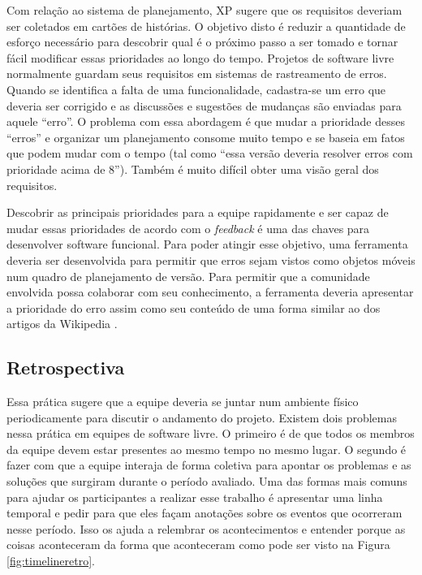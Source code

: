 Com relação ao sistema de planejamento, XP sugere que os requisitos
deveriam ser coletados em cartões de histórias. O objetivo disto é
reduzir a quantidade de esforço necessário para descobrir qual é o
próximo passo a ser tomado e tornar fácil modificar essas prioridades
ao longo do tempo. Projetos de software livre normalmente guardam seus
requisitos em sistemas de rastreamento de erros. Quando se identifica
a falta de uma funcionalidade, cadastra-se um erro que deveria ser
corrigido e as discussões e sugestões de mudanças são enviadas para
aquele ``erro''. O problema com essa abordagem é que mudar a
prioridade desses ``erros'' e organizar um planejamento consome muito
tempo e se baseia em fatos que podem mudar com o tempo (tal como
``essa versão deveria resolver erros com prioridade acima de
8''). Também é muito difícil obter uma visão geral dos requisitos.

Descobrir as principais prioridades para a equipe rapidamente e ser
capaz de mudar essas prioridades de acordo com o \emph{feedback} é uma
das chaves para desenvolver software funcional. Para poder atingir
esse objetivo, uma ferramenta deveria ser desenvolvida para permitir
que erros sejam vistos como objetos móveis num quadro de planejamento
de versão. Para permitir que a comunidade envolvida possa colaborar
com seu conhecimento, a ferramenta deveria apresentar a prioridade do
erro assim como seu conteúdo de uma forma similar ao dos artigos da
Wikipedia \cite{Surowiecki2004,Tapscott2006,Benkler2006}.

\subsection{Retrospectiva}
\label{subsec:retrospect}

Essa prática sugere que a equipe deveria se juntar num ambiente físico
periodicamente para discutir o andamento do projeto. Existem dois
problemas nessa prática em equipes de software livre. O primeiro é de
que todos os membros da equipe devem estar presentes ao mesmo tempo no
mesmo lugar. O segundo é fazer com que a equipe interaja de forma
coletiva para apontar os problemas e as soluções que surgiram durante
o período avaliado. Uma das formas mais comuns para ajudar os
participantes a realizar esse trabalho é apresentar uma linha temporal
e pedir para que eles façam anotações sobre os eventos que ocorreram
nesse período. Isso os ajuda a relembrar os acontecimentos e entender
porque as coisas aconteceram da forma que aconteceram como pode ser
visto na Figura \ref{fig:timelineretro}.

